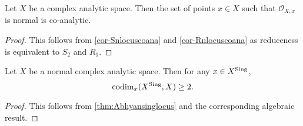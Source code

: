 \begin{thm}\label{thm-normallocusopen}
    Let $X$ be a complex analytic space. Then the set of points $x\in X$ such that $\mathcal{O}_{X,x}$ is normal is co-analytic.
\end{thm}
\begin{proof}
    This follows from \cref{cor-Snlocuscoana} and \cref{cor-Rnlocuscoana} as reduceness is equivalent to $S_2$ and $R_1$.
\end{proof}

\begin{proposition}\label{prop-normalspacesingcodim2}
    Let $X$ be a normal complex analytic space. Then for any $x\in X^{\operatorname{Sing}}$, 
    \[
        \operatorname{codim}_x(X^{\operatorname{Sing}},X)\geq 2.  
    \]
\end{proposition}
\begin{proof}
    This follows from \cref{thm:Abhyansinglocus} and the corresponding algebraic result.
\end{proof}

